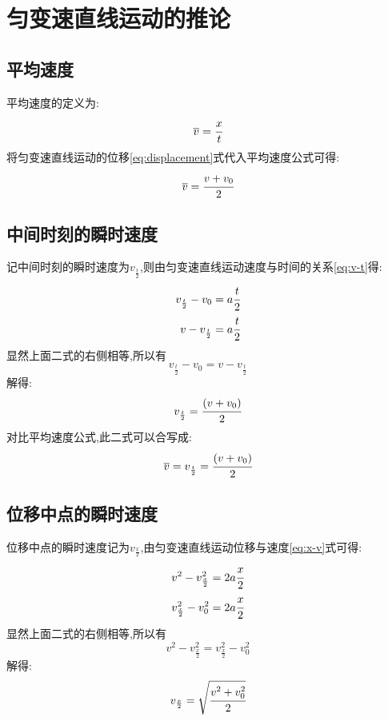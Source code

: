 \section{匀变速直线运动的推论}
\subsection{平均速度}
平均速度的定义为:
$$\overline{v}=\cfrac{x}{t}$$
将匀变速直线运动的位移\eqref{eq:displacement}式代入平均速度公式可得:
\begin{equation}
\overline{v}=\cfrac{v+v_0}{2}
  \label{eq:average}
\end{equation}

\subsection{中间时刻的瞬时速度}

记中间时刻的瞬时速度为$v_{\frac{t}{2}}$,则由匀变速直线运动速度与时间的关系\eqref{eq:v-t}得:
\begin{align}
v_{\frac{t}{2}}-v_0 &=a\cfrac{t}{2}\\
v-v_{\frac{t}{2}} &=a\cfrac{t}{2}
\end{align}
显然上面二式的右侧相等,所以有
\begin{equation*}
v_{\frac{t}{2}}-v_0=v-v_{\frac{t}{2}}
\end{equation*}
解得:
\begin{equation}
v_{\frac{t}{2}}=\cfrac{(v+v_0)}{2}
  \label{eq:v-half-t}
\end{equation}
对比平均速度公式,此二式可以合写成:
\begin{equation}
\overline{v}=v_{\frac{t}{2}}=\cfrac{(v+v_0)}{2}
  \label{eq:v-average-half}
\end{equation}

\subsection{位移中点的瞬时速度}

位移中点的瞬时速度记为$v_{\frac{x}{2}}$,由匀变速直线运动位移与速度\eqref{eq:x-v}式可得:
\begin{align}
v^2-v_{\frac{x}{2}}^2 &=2a\cfrac{x}{2}\\
v_{\frac{x}{2}}^2-v_0^2 &=2a\cfrac{x}{2}
\end{align}
显然上面二式的右侧相等,所以有
\begin{equation*}
v^2-v_{\frac{x}{2}}^2=v_{\frac{x}{2}}^2-v_0^2
\end{equation*}
解得:
\begin{equation}
v_{\frac{x}{2}}=\sqrt{\cfrac{v^2+v_0^2}{2}}
  \label{eq:v-half-x}
\end{equation}


